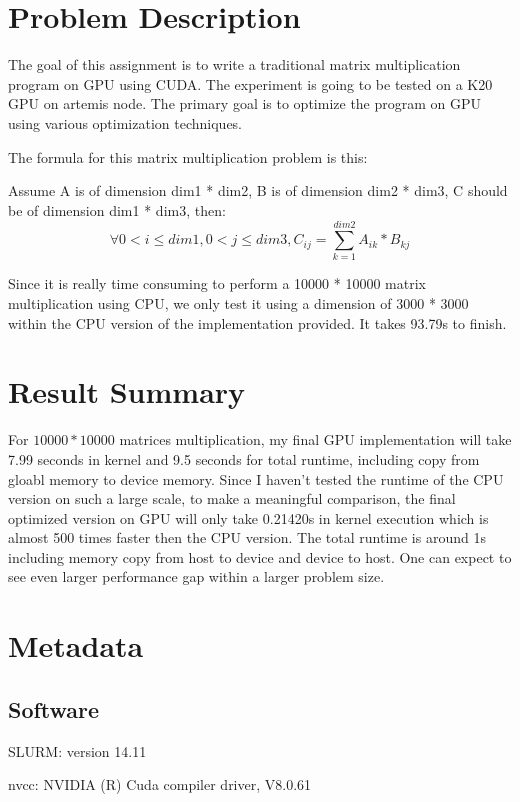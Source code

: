 \documentclass{cs4444}
\begin{document}
\maketitle

\section{Problem Description}
The goal of this assignment is to write a traditional matrix multiplication program on GPU using CUDA. The experiment is going to be tested on a K20 GPU on artemis node. The primary goal is to optimize the program on GPU using various optimization techniques.

The formula for this matrix multiplication problem is this:

Assume A is of dimension dim1 * dim2, B is of dimension dim2 * dim3, C should be of dimension dim1 * dim3, then:
\[
	\forall 0 < i \leq dim1, 0 < j \leq dim3, C_{ij} = \sum_{k=1}^{dim2} A_{ik} * B_{kj}  
\]
	
Since it is really time consuming to perform a 10000 * 10000 matrix multiplication using CPU, we only test it using a dimension of 3000 * 3000 within the CPU version of the implementation provided. 
	It takes 93.79s to finish.
	
\section{Result Summary}
For $10000 * 10000$ matrices multiplication, my final GPU implementation will take 7.99 seconds in kernel and 9.5 seconds for total runtime, including copy from gloabl memory to device memory. Since I haven't tested the runtime of the CPU version on such a large scale, to make a meaningful comparison, the final optimized version on GPU will only take 0.21420s in kernel execution which is almost 500 times faster then the CPU version. The total runtime is around 1s including memory copy from host to device and device to host. One can expect to see even larger performance gap within a larger problem size.

\section{Metadata}
\subsection{Software}
	SLURM: version 14.11
	
	nvcc: NVIDIA (R) Cuda compiler driver, V8.0.61	
		
\end{document}
